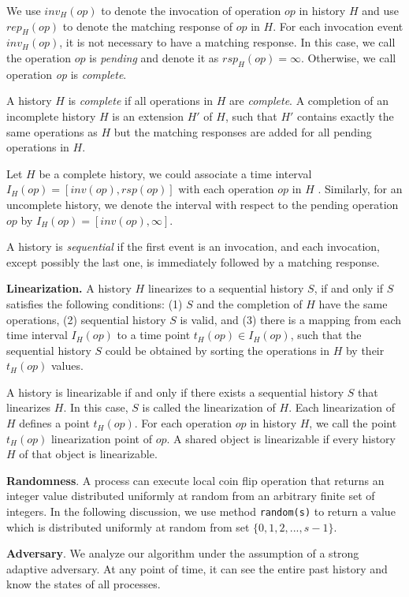 We use $inv_H(op)$ to denote the invocation of operation $op$ in history $H$ and use $rep_H(op)$ to denote the matching response of $op$ in $H$. For each invocation event $inv_H(op)$, it is not necessary to have a matching response. In this case, we call the operation $op$ is \emph{pending} and denote it as $rsp_H(op) = \infty$. Otherwise, we call operation \emph{op} is \emph{complete}.

A history $H$ is \emph{complete} if all operations in $H$ are \emph{complete}. A completion of an incomplete history $H$ is an extension $H'$ of $H$, such that $H'$ contains exactly the same operations as $H$ but the matching responses are added for all pending operations in $H$.

Let $H$ be a complete history, we could associate a time interval $I_H(op) = [inv(op), rsp(op)]$ with each operation $op$ in $H$ . Similarly, for an uncomplete history, we denote the interval with respect to the pending operation $op$ by $I_H(op) = [inv(op), \infty]$.

A history is \emph{sequential} if the first event is an invocation, and each invocation, except possibly the last one, is immediately followed by a matching response.


\textbf{Linearization.} A history $H$ linearizes to a sequential history $S$, if and only if $S$ satisfies the following conditions: (1) $S$ and the completion of $H$ have the same operations, (2) sequential history $S$ is valid, and (3) there is a mapping from each time interval $I_H(op)$ to a time point $t_H(op) \in I_H(op)$, such that the sequential history $S$ could be obtained by sorting the operations in $H$ by their $t_H(op)$ values.

A history is linearizable if and only if there exists a sequential history $S$ that linearizes $H$. In this case, $S$ is called the linearization of $H$. Each linearization of $H$ defines a point $t_H(op)$. For each operation $op$ in history $H$, we call the point $t_H(op)$ linearization point of $op$. A shared object is linearizable if every history $H$ of that object is linearizable.

\textbf{Randomness}. A process can execute local coin flip operation that returns an integer value distributed uniformly at random from an arbitrary finite set of integers. In the following discussion, we use method \texttt{random(s)} to return a value which is distributed uniformly at random from set $\{0, 1, 2,..., s-1\}$.

\textbf{Adversary}. We analyze our algorithm under the assumption of a strong adaptive adversary. At any point of time, it can see the entire past history and know the states of all processes. 


